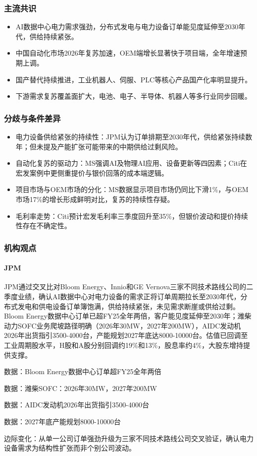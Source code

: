 \documentclass[11pt]{ctexart}
\begin{document}
\subsubsection*{主流共识}
\begin{itemize}
  \item AI数据中心电力需求强劲，分布式发电与电力设备订单能见度延伸至2030年代，供给持续紧张。
  \item 中国自动化市场2026年复苏加速，OEM端增长显著快于项目端，全年增速预期上调。
  \item 国产替代持续推进，工业机器人、伺服、PLC等核心产品国产化率明显提升。
  \item 下游需求复苏覆盖面扩大，电池、电子、半导体、机器人等多行业同步回暖。
\end{itemize}
\subsubsection*{分歧与条件差异}
\begin{itemize}
  \item 电力设备供给紧张的持续性：JPM认为订单排期至2030年代，供给紧张持续数年；但未提及产能扩张可能带来的中期供给过剩风险。
  \item 自动化复苏的驱动力：MS强调AI及物理AI应用、设备更新等四因素；Citi在宏发案例中更侧重提价与银价回落的成本端逻辑。
  \item 项目市场与OEM市场的分化：MS数据显示项目市场仍同比下滑1\%，与OEM市场17\%的增长形成鲜明对比，复苏的持续性存疑。
  \item 毛利率走势：Citi预计宏发毛利率三季度回升至35\%，但银价波动和提价持续性存在不确定性。
\end{itemize}
\subsubsection*{机构观点}
\paragraph{JPM} JPM通过交叉比对Bloom Energy、Innio和GE Vernova三家不同技术路线公司的二季度业绩，确认AI数据中心对电力设备的需求正将订单周期拉长至2030年代，分布式发电和供电设备订单簿饱满，供给持续紧张，未见需求断崖或供给过剩。Bloom Energy数据中心订单已超FY25全年两倍，客户能见度延伸至2030年；潍柴动力SOFC业务爬坡路径明确（2026年30MW，2027年200MW），AIDC发动机2026年出货指引3500-4000台，产能规划2027年底达8000-10000台。估值已回调至工业周期股水平，H股和A股分别回调约19\%和13\%，股息率约4\%，大股东增持提供支撑。
{\small\color{refgray}数据：Bloom Energy数据中心订单超FY25全年两倍\par}
{\small\color{refgray}数据：潍柴SOFC：2026年30MW，2027年200MW\par}
{\small\color{refgray}数据：AIDC发动机2026年出货指引3500-4000台\par}
{\small\color{refgray}数据：2027年底产能规划8000-10000台\par}
{\small\color{refgray}边际变化：从单一公司订单强劲升级为三家不同技术路线公司交叉验证，确认电力设备需求为结构性扩张而非个别公司波动。\par}
\end{document}
